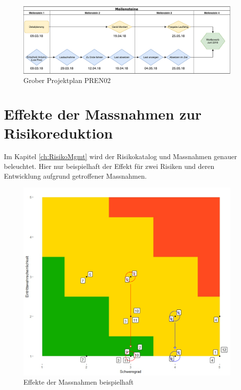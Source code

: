 \documentclass[a4paper]{report}
\begin{document}
\begin{figure}[h!]
	\includegraphics[width=\linewidth,keepaspectratio]{Rahmenplan}
	\caption{Grober Projektplan PREN02}
	\label{fig:GrobProjektReal}
\end{figure}

\section{Effekte der Massnahmen zur Risikoreduktion}

Im Kapitel \ref{ch:RisikoMgmt} wird der Risikokatalog und Massnahmen genauer beleuchtet. Hier nur beispielhaft der Effekt für zwei Risiken und deren Entwicklung aufgrund getroffener Massnahmen.

\begin{figure}[h!]
	\includegraphics[width=\linewidth,keepaspectratio]{RisikomatrixSquashed}
	\caption{Effekte der Massnahmen beispielhaft}
	\label{fig:RiskMatSquashed}
\end{figure}
\end{document}
